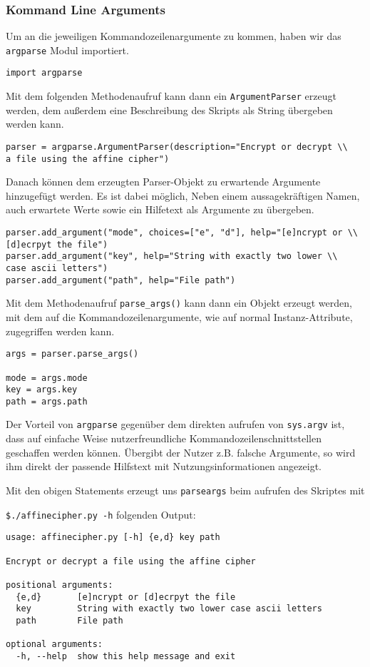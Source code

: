 \documentclass[12pt]{article}
\begin{document}
\subsubsection{Kommand Line Arguments}
Um an die jeweiligen Kommandozeilenargumente zu kommen, haben wir das \texttt{argparse} Modul importiert.
\begin{lstlisting}
import argparse
\end{lstlisting}
Mit dem folgenden Methodenaufruf kann dann ein \texttt{ArgumentParser} erzeugt werden, dem außerdem eine Beschreibung des Skripts als String übergeben werden kann.
\begin{lstlisting}
parser = argparse.ArgumentParser(description="Encrypt or decrypt \\
a file using the affine cipher")
\end{lstlisting}
Danach können dem erzeugten Parser-Objekt zu erwartende Argumente hinzugefügt werden. Es ist dabei möglich, Neben einem aussagekräftigen Namen, auch erwartete Werte sowie ein Hilfetext als Argumente zu übergeben.
\begin{lstlisting}
parser.add_argument("mode", choices=["e", "d"], help="[e]ncrypt or \\
[d]ecrpyt the file")
parser.add_argument("key", help="String with exactly two lower \\
case ascii letters")
parser.add_argument("path", help="File path")
\end{lstlisting}
Mit dem Methodenaufruf \texttt{parse\_args()} kann dann ein Objekt erzeugt werden, mit dem auf die Kommandozeilenargumente, wie auf normal Instanz-Attribute, zugegriffen werden kann.
\begin{lstlisting}
args = parser.parse_args()

mode = args.mode
key = args.key
path = args.path
\end{lstlisting}
Der Vorteil von \texttt{argparse} gegenüber dem direkten aufrufen von \texttt{sys.argv} ist, dass auf einfache Weise nutzerfreundliche Kommandozeilenschnittstellen geschaffen werden können. Übergibt der Nutzer z.B. falsche Argumente, so wird ihm direkt der passende Hilfstext mit Nutzungsinformationen angezeigt.

Mit den obigen Statements erzeugt uns \texttt{parseargs} beim aufrufen des Skriptes mit 

\texttt{\$./affinecipher.py -h} folgenden Output:
\begin{lstlisting}
usage: affinecipher.py [-h] {e,d} key path

Encrypt or decrypt a file using the affine cipher

positional arguments:
  {e,d}       [e]ncrypt or [d]ecrpyt the file
  key         String with exactly two lower case ascii letters
  path        File path

optional arguments:
  -h, --help  show this help message and exit
\end{lstlisting}
\end{document}
